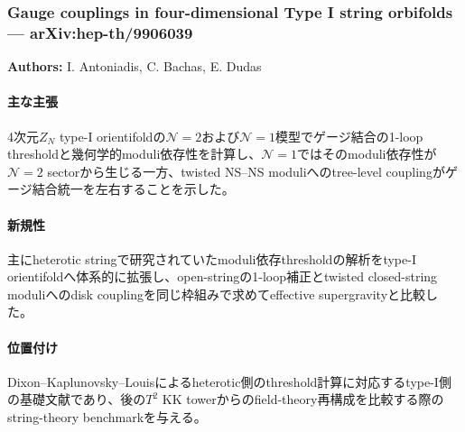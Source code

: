 \subsubsection{Gauge couplings in four-dimensional Type I string orbifolds --- arXiv:hep-th/9906039}

\textbf{Authors:} I. Antoniadis, C. Bachas, E. Dudas

\paragraph{主な主張}
4次元$Z_N$ type-I orientifoldの$\mathcal{N}=2$および$\mathcal{N}=1$模型でゲージ結合の1-loop thresholdと幾何学的moduli依存性を計算し、$\mathcal{N}=1$ではそのmoduli依存性が$\mathcal{N}=2$ sectorから生じる一方、twisted NS--NS moduliへのtree-level couplingがゲージ結合統一を左右することを示した\cite{Antoniadis:1999TypeIThresholds}。

\paragraph{新規性}
主にheterotic stringで研究されていたmoduli依存thresholdの解析をtype-I orientifoldへ体系的に拡張し、open-stringの1-loop補正とtwisted closed-string moduliへのdisk couplingを同じ枠組みで求めてeffective supergravityと比較した。

\paragraph{位置付け}
Dixon--Kaplunovsky--Louisによるheterotic側のthreshold計算\cite{Dixon:1991Thresholds}に対応するtype-I側の基礎文献であり、後の$T^2$ KK towerからのfield-theory再構成\cite{Ghilencea:2002StringThresholds}を比較する際のstring-theory benchmarkを与える。
